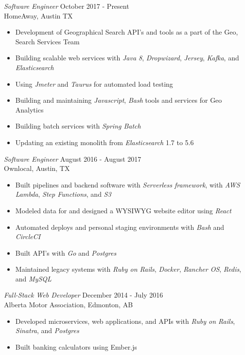 \documentclass[margin, 10pt]{res} %
\begin{document}
\begin{resume}
{\sl Software Engineer} \hfill October 2017 - Present \\
HomeAway, Austin TX
\begin{itemize}
    \item Development of Geographical Search API's and tools as a part of the Geo, Search Services Team
    \item Building scalable web services with {\it Java 8}, {\it Dropwizard}, {\it Jersey}, {\it Kafka}, and {\it Elasticsearch}
    \item Using {\it Jmeter} and {\it Taurus} for automated load testing
    \item Building and maintaining {\it Javascript}, {\it Bash} tools and services for Geo Analytics
    \item Building batch services with {\it Spring Batch}
    \item Updating an existing monolith from {\it Elasticsearch} 1.7 to 5.6
\end{itemize}


{\sl Software Engineer } \hfill August 2016 - August 2017 \\
Ownlocal, Austin, TX
\begin{itemize}
    \item Built pipelines and backend software with {\it Serverless framework}, with {\it AWS Lambda}, {\it Step Functions}, and {\it S3}
    \item Modeled data for and designed a WYSIWYG website editor using {\it React}
    \item Automated deploys and personal staging environments with {\it Bash} and {\it CircleCI}
    \item Built API's with {\it Go} and {\it Postgres}
    \item Maintained legacy systems with {\it Ruby on Rails}, {\it Docker}, {\it Rancher OS}, {\it Redis}, and {\it MySQL}
\end{itemize}

{\sl Full-Stack Web Developer} \hfill December 2014 - July 2016 \\
Alberta Motor Association, Edmonton, AB
\begin{itemize} 
    \item Developed microservices, web applications, and APIs with {\it Ruby on Rails}, {\it Sinatra}, and {\it Postgres}
    \item Built banking calculators using Ember.js
\end{itemize}



\end{resume}
\end{document}
